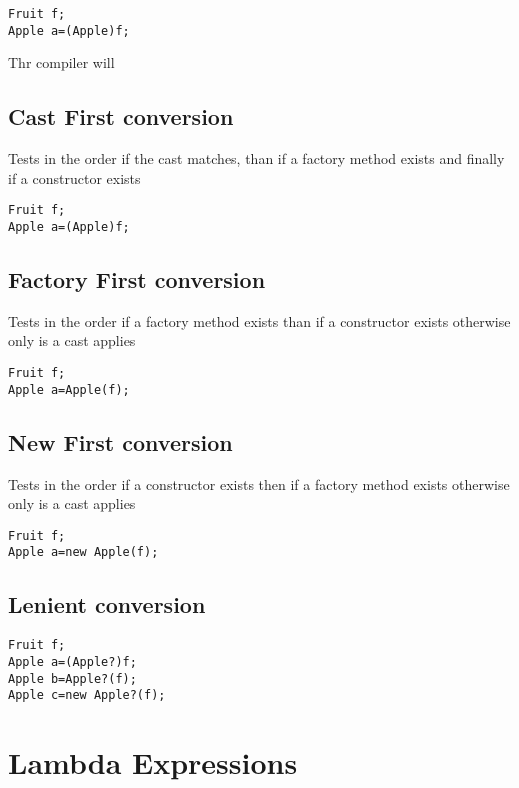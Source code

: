 \documentclass{tufte-book}
\begin{document}
                \begin{lstlisting}
Fruit f;
Apple a=(Apple)f;
                \end{lstlisting}
Thr compiler will 
             \subsection{Cast First conversion}
             Tests in the order if the cast matches, than if a factory method exists and finally if a constructor exists
                \begin{lstlisting}
Fruit f;
Apple a=(Apple)f;
                \end{lstlisting}

             \subsection{Factory First conversion}
             Tests in the order if a factory method exists than if a constructor exists otherwise only is a cast applies
                \begin{lstlisting}
Fruit f;
Apple a=Apple(f);
                \end{lstlisting}
             \subsection{New First conversion}
             Tests in the order if a constructor exists then if a factory method exists otherwise only is a cast applies
                \begin{lstlisting}
Fruit f;
Apple a=new Apple(f);
                \end{lstlisting}
             \subsection{Lenient conversion}
                \begin{lstlisting}
Fruit f;
Apple a=(Apple?)f;
Apple b=Apple?(f);
Apple c=new Apple?(f);
                \end{lstlisting}

            \section{Lambda Expressions}
            
\end{document}
